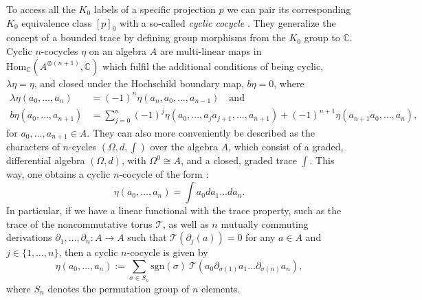 \documentclass[submission, Phys]{SciPost}
\begin{document}
To access all the $K_0$ labels of a specific projection $p$ we can pair its corresponding $K_0$ equivalence class $[p]_0$ with a so-called \emph{cyclic cocycle} \cite{Connes1994,Gracia2000,Khalkhali2013}. 
They generalize the concept of a bounded trace by defining group morphisms from the $K_0$ group to $\mathbb{C}$.
Cyclic $n$-cocycles $\eta$ on an algebra $A$ are multi-linear maps in $\mathrm{Hom}_{\mathbb{C}}(A^{\otimes(n+1)},\mathbb{C})$ which fulfil the additional conditions of being cyclic, $\lambda \eta = \eta$, and closed under the Hochschild boundary map, $b\eta=0$, where
\begin{align}
    \lambda \eta(a_0,\dots,a_n)&=(-1)^n \eta(a_n,a_0,\dots,a_{n-1})\quad \mathrm{and} \\
    b \eta(a_0,\dots,a_{n+1}) &= \sum_{j=0}^n (-1)^j \eta(a_0,\dots,a_ja_{j+1},\dots,a_{n+1}) + (-1)^{n+1}\eta(a_{n+1}a_0,\dots,a_n),
\end{align}
for $a_0,\dots,a_{n+1}\in A$.
They can also more conveniently be described as the characters of $n$-cycles $(\Omega,d,\int)$ over the algebra $A$, which consist of a graded, differential algebra $(\Omega,d)$, with $\Omega^0\cong A$, and a closed, graded trace $\int$. 
This way, one obtains a cyclic $n$-cocycle of the form \cite[III.1.$\alpha$. Prop. 4]{Connes1994}:
\begin{equation}
    \eta(a_0,\dots,a_n) = \int a_0 da_1\dots da_n.
\end{equation}
In particular, if we have a linear functional with the trace property, such as the trace of the noncommutative torus $\mathcal{T}$, as well as $n$ mutually commuting derivations $\partial_1,\dots,\partial_n: A\rightarrow A$ such that $\mathcal{T}(\partial_j(a))=0$ for any $a\in A$ and $j\in\{1,\dots,n\}$, then a cyclic $n$-cocycle is given by \cite[Example~3.6.6]{Khalkhali2013}
\begin{equation}
    \eta(a_0,\dots,a_n) := \sum_{\sigma\in S_n} \mathrm{sgn}(\sigma)\ \mathcal{T}(a_0 \partial_{\sigma(1)}a_1\dots \partial_{\sigma(n)}a_n),
\end{equation}
where $S_n$ denotes the permutation group of $n$ elements.
\end{document}
